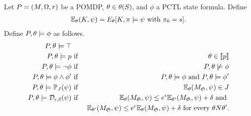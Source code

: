 Let $P = (M, \Omega, r)$ be a POMDP, $\theta \in \theta (S)$, and
$\phi$ a PCTL state formula. Define
\begin{eqnarray*}
  \mathbb{E}_{\theta}({K}, {\psi}) = E_{\theta} [K, \pi \models \psi
  \textmd{ with } \pi_0 = s].
\end{eqnarray*}
Define $P, \theta \models \phi$ as follows.
\begin{eqnarray*}
  P, \theta \models \top \\
  P, \theta \models p & \textmd{ if } & \theta \in [\![{p}]\!]\\
  P, \theta \models \neg \phi & \textmd{ if } & P, \theta \not\models \phi\\
  P, \theta \models \phi \wedge \phi' & \textmd{ if } &
       P, \theta \models \phi \textmd{ and } P, \theta \models \phi'\\
  P, \theta \models \mathbb{P}_{J} (\psi) & \textmd{ if } &
       \mathbb{E}_{\theta}({M_{\mathfrak{S}}}, {\psi}) \in J \\
  P, \theta \models \mathcal{D}_{{\epsilon}, {\delta}} (\psi) & \textmd{ if } &
       \mathbb{E}_{\theta}({M_{\mathfrak{S}}}, {\psi}) \leq e^{\epsilon}
       \mathbb{E}_{\theta'}({M_{\mathfrak{S}}}, {\psi}) + \delta \textmd{ and }\\
  &&   \mathbb{E}_{\theta'}({M_{\mathfrak{S}}}, {\psi}) \leq e^{\epsilon}
       \mathbb{E}_{\theta}({M_{\mathfrak{S}}}, {\psi}) + \delta \textmd{ for
     every } \theta N \theta'.
\end{eqnarray*}
